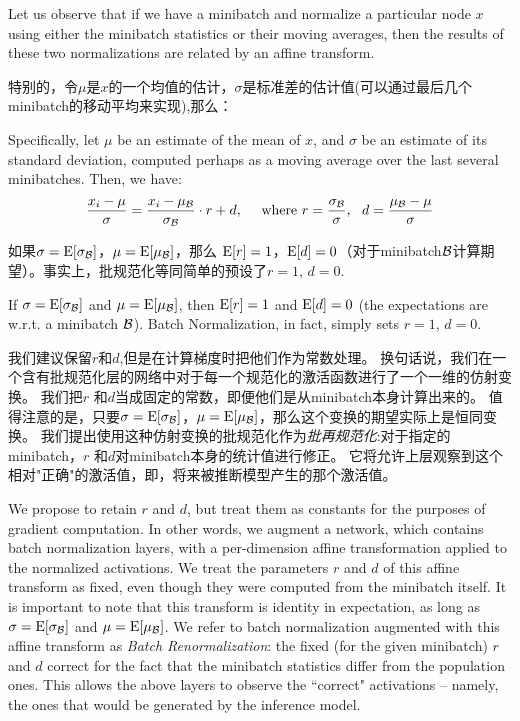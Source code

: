 Let us observe that if we have a minibatch and normalize a particular node  $x$ using either the minibatch statistics or their moving averages, then the results of these two normalizations are related by an affine transform.

特别的，令$\mu$是$x$的一个均值的估计，$\sigma$是标准差的估计值(可以通过最后几个minibatch的移动平均来实现),那么：

Specifically, let $\mu$ be an estimate of the mean of $x$, and $\sigma$ be an estimate of its standard deviation, computed perhaps as a moving average over the last several minibatches. Then, we have:
$$
\frac{x_i-\mu}{\sigma} = \frac{x_i-\mu_{\mathcal{B}}}{\sigma_{\mathcal{B}}} \cdot r + d,\ \ \ \ \text{where $ r = \frac{\sigma_{\mathcal{B}}}{\sigma}, \ \  d = \frac{\mu_{\mathcal{B}}-\mu}{\sigma}$}
$$

如果$\sigma = \mathrm{E}[\sigma_{\mathcal{B}}]$，$\mu=\mathrm{E}[\mu_{\mathcal{B}}]$，那么 $\mathrm{E}[r] = 1$，$\mathrm{E}[d] = 0$（对于minibatch$\mathcal{B}$计算期望）。事实上，批规范化等同简单的预设了$r=1$, $d=0$.

If  $\sigma = \mathrm{E}[\sigma_{\mathcal{B}}]$ and $\mu=\mathrm{E}[\mu_{\mathcal{B}}]$, then $\mathrm{E}[r] = 1$ and $\mathrm{E}[d] = 0$  (the expectations are w.r.t. a minibatch $\mathcal{B}$). Batch Normalization, in fact, simply sets $r=1$, $d=0$.

我们建议保留$r$和$d$,但是在计算梯度时把他们作为常数处理。
换句话说，我们在一个含有批规范化层的网络中对于每一个规范化的激活函数进行了一个一维的仿射变换。
我们把$r$ 和$d$当成固定的常数，即便他们是从minibatch本身计算出来的。
值得注意的是，只要$\sigma = \mathrm{E}[\sigma_{\mathcal{B}}]$，$\mu=\mathrm{E}[\mu_{\mathcal{B}}]$，那么这个变换的期望实际上是恒同变换。
我们提出使用这种仿射变换的批规范化作为{\em 批再规范化}:对于指定的minibatch，$r$ 和$d$对minibatch本身的统计值进行修正。
它将允许上层观察到这个相对"正确"的激活值，即，将来被推断模型产生的那个激活值。

We propose to retain $r$ and $d$, but treat them as constants for the purposes of gradient computation. In other words, we augment a  network, which contains batch normalization layers, with a per-dimension affine transformation applied to the normalized activations. We treat the parameters $r$ and $d$ of this affine transform as fixed, even though they were computed from the minibatch itself. It is important to note that this transform  is identity in expectation, as long as  $\sigma = \mathrm{E}[\sigma_{\mathcal{B}}]$ and $\mu=\mathrm{E}[\mu_{\mathcal{B}}]$. We refer to batch normalization augmented with this affine transform as {\em Batch Renormalization}: the fixed (for the given minibatch) $r$ and $d$ correct for the fact that the minibatch statistics differ from the population ones. This allows the above layers to observe the ``correct"  activations -- namely, the ones that would be generated by the inference model.

